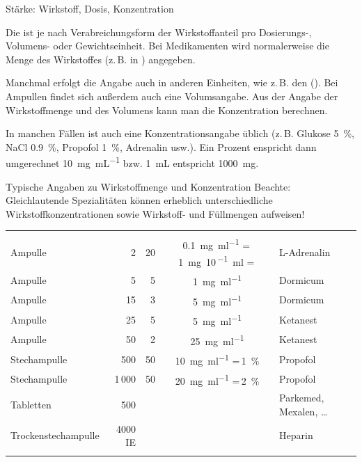 \Text
{Stärke: Wirkstoff, Dosis, Konzentration}
{Die  ist je nach Verabreichungsform der Wirkstoffanteil pro Dosierungs-, Volumens- oder Gewichtseinheit.
%
Bei Medikamenten wird normalerweise die Menge des
Wirkstoffes (z.\,B. in \Mg) angegeben. 
%

Manchmal erfolgt die
Angabe auch in anderen Einheiten, wie z.\,B. den
 (). Bei Ampullen findet sich außerdem auch eine Volumsangabe.
Aus der Angabe der Wirkstoffmenge und des Volumens kann man
die Konzentration berechnen.
%

In manchen Fällen ist auch eine Konzentrationsangabe üblich 
(z.\,B. 
Glukose \SI{5}{\percent}, 
NaCl \SI{0,9}{\percent}, 
Propofol \SI{1}{\percent}, Adrenalin  
usw.). 
%
Ein Prozent enspricht dann umgerechnet \SI{10}{\milli\gram\per\milli\liter}
bzw. \SI{1}{\milli\liter} entspricht \SI{1000}{\milli\gram}.


\TableWide
{Typische Angaben zu Wirkstoffmenge und Konzentration}%
{Beachte: 
Gleichlautende Spezialitäten können erheblich unterschiedliche Wirkstoffkonzentrationen sowie Wirkstoff- und Füllmengen aufweisen!}%
{}%
{}%
{}%
{%
\begin{tabulary}{\linewidth}{LRRCL}
\toprule\addlinespace
\noindent{} 	& \noindent{} 	& \noindent{} 	& \noindent{}							& \noindent{}
\\\addlinespace\midrule\addlinespace
Ampulle 			& 2\Mg* 						& 20\Ml* 				& \SI{0,1}{\mg\per\ml} \newline=\,\SI{1}{\mg\per{10\,}\ml}
\newline =\,	& L-Adrenalin
\\\addlinespace
Ampulle 			& 5\Mg* 						& 5\Ml* 				& \SI{1}{\mg\per\ml}								& Dormicum{\texttrademark}
\\
Ampulle 			& 15\Mg* 						& 3\Ml* 				& \SI{5}{\mg\per\ml}								& Dormicum{\texttrademark}
\\\addlinespace
Ampulle 			& 25\Mg* 						& 5\Ml* 				& \SI{5}{\mg\per\ml}								& Ketanest{\texttrademark}
\\
Ampulle 			& 50\Mg* 						& 2\Ml* 				& \SI{25}{\mg\per\ml}								& Ketanest{\texttrademark}
\\\addlinespace
Stechampulle 			& 500\Mg* 						& 50\Ml* 				& \SI{10}{\mg\per\ml} 
=\,\SI{1}{\percent}	& Propofol
\\
Stechampulle 			& 1\,000\Mg* 						& 50\Ml* 				& \SI{20}{\mg\per\ml} 
=\,\SI{2}{\percent}	& Propofol
\\\addlinespace
Tabletten 			& 500\Mg* 						&						&														& Parkemed{\texttrademark}, Mexalen{\texttrademark}, \ldots
\\\addlinespace
Trockenstechampulle & 4000 IE						&						&														& Heparin
\\\addlinespace\bottomrule\addlinespace
\end{tabulary}
}%
{}%


}
